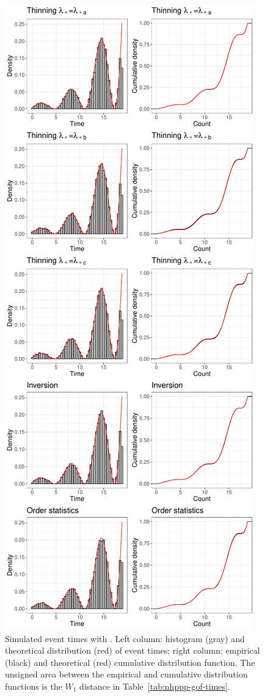 \documentclass[article,nojss]{jss}\usepackage[]{graphicx}\usepackage[]{xcolor}
\makeatletter
\def\maxwidth{ %
  \ifdim\Gin@nat@width>\linewidth
    \linewidth
  \else
    \Gin@nat@width
  \fi
}
\newenvironment{knitrout}{}{} %
\makeatother
\begin{document}
\begin{knitrout}
\color{fgcolor}\begin{figure}

{\centering \includegraphics[width=\maxwidth,height=\textheight,keepaspectratio=true]{figure/epdf-nhppp-pkg-times-1} 

}

\caption{Simulated event times with . Left column: histogram (gray) and theoretical distribution (red) of event times; right column: empirical (black) and theoretical (red) cumulative distribution function. The unsigned area between the empirical and cumulative distribution functions is the $W_1$ distance in Table~\ref{tab:nhppp-gof-times}.}\label{fig:epdf-nhppp-pkg-times}
\end{figure}

\end{knitrout}
\end{document}
